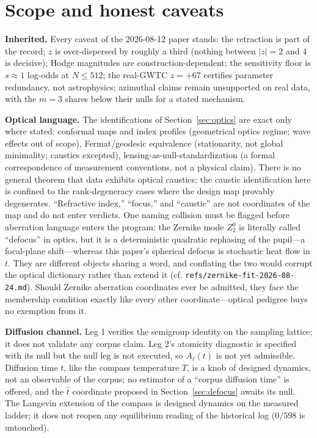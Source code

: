 \documentclass[11pt,a4paper]{article}
\theoremstyle{plain}
\theoremstyle{remark}
\begin{document}
\section{Scope and honest caveats}
\label{sec:scope}

\textbf{Inherited.} Every caveat of the 2026-08-12 paper stands: the retraction is part of the record; $z$ is over-dispersed by roughly a third (nothing between $|z|=2$ and $4$ is decisive); Hodge magnitudes are construction-dependent; the sensitivity floor is $s\approx1$ log-odds at $N\le512$; the real-GWTC $z=+67$ certifies parameter redundancy, not astrophysics; azimuthal claims remain unsupported on real data, with the $m{=}3$ shares below their nulls for a stated mechanism.

\textbf{Optical language.} The identifications of Section~\ref{sec:optics} are exact only where stated: conformal maps and index profiles (geometrical optics regime; wave effects out of scope), Fermat/geodesic equivalence (stationarity, not global minimality; caustics excepted), lensing-as-null-standardization (a formal correspondence of measurement conventions, not a physical claim). There is no general theorem that data exhibits optical caustics; the caustic identification here is confined to the rank-degeneracy cases where the design map provably degenerates. ``Refractive index,'' ``focus,'' and ``caustic'' are not coordinates of the map and do not enter verdicts. One naming collision must be flagged before aberration language enters the program: the Zernike mode $Z_2^0$ is literally called ``defocus'' in optics, but it is a deterministic quadratic rephasing of the pupil---a focal-plane shift---whereas this paper's spherical defocus is stochastic heat flow in $t$. They are different objects sharing a word, and conflating the two would corrupt the optical dictionary rather than extend it (cf. \texttt{refs/zernike-fit-2026-08-24.md}). Should Zernike aberration coordinates ever be admitted, they face the membership condition exactly like every other coordinate---optical pedigree buys no exemption from it.

\textbf{Diffusion channel.} Leg 1 verifies the semigroup identity on the sampling lattice; it does not validate any corpus claim. Leg 2's atomicity diagnostic is specified with its null but the null leg is not executed, so $A_\ell(t)$ is not yet admissible. Diffusion time $t$, like the compass temperature $T$, is a knob of designed dynamics, not an observable of the corpus; no estimator of a ``corpus diffusion time'' is offered, and the $\hat t$ coordinate proposed in Section~\ref{sec:defocus} awaits its null. The Langevin extension of the compass is designed dynamics on the measured ladder; it does not reopen any equilibrium reading of the historical log ($0/598$ is untouched).
\end{document}
